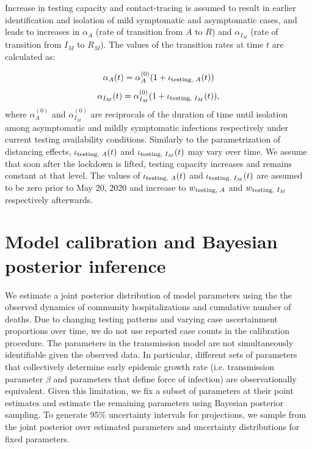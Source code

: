 \documentclass[11pt]{article}
\begin{document}
Increase in testing capacity and contact-tracing is assumed to result in earlier identification and isolation of mild symptomatic and asymptomatic cases, and leads to increases in $\alpha_A$ (rate of transition from $A$ to $R$) and $\alpha_{I_M}$ (rate of transition from $I_M$ to $R_M$). The values of the transition rates at time $t$ are calculated as:

\[ \alpha_A(t) = \alpha_A^{(0)} (1 + \iota\textsubscript{testing, $A$} (t)) \]
\[ \alpha_{I_M}(t) = \alpha_{I_M}^{(0)} (1 + \iota\textsubscript{testing, $I_M$} (t)), \]
where $\alpha_A^{(0)}$ and $\alpha_{I_M}^{(0)}$ are reciprocals of the duration of time until isolation among asymptomatic and mildly symptomatic infections respectively under current testing availability conditions. Similarly to the parametrization of distancing effects, $\iota\textsubscript{testing, $A$} (t)$ and $\iota\textsubscript{testing, $I_M$} (t)$ may vary over time. 
We assume that soon after the lockdown is lifted, testing capacity increases and remains constant at that level. The values of $\iota\textsubscript{testing, $A$} (t)$ and $\iota\textsubscript{testing, $I_M$} (t)$ are assumed to be zero prior to May 20, 2020 and increase to $w\textsubscript{testing, $A$}$ and $w\textsubscript{testing, $I_M$}$ respectively afterwards.  





\section{Model calibration and Bayesian posterior inference}


We estimate a joint posterior distribution of model parameters using the the observed dynamics of community hospitalizations and cumulative number of deaths.  Due to changing testing patterns and varying case ascertainment proportions over time, we do not use reported case counts in the calibration procedure.  The parameters in the transmission model are not simultaneously identifiable given the observed data. In particular, different sets of parameters that collectively determine early epidemic growth rate (i.e. transmission parameter $\beta$ and parameters that define force of infection) are observationally equivalent. Given this limitation, we fix a subset of parameters at their point estimates and estimate the remaining parameters using Bayesian posterior sampling.  To generate 95\% uncertainty intervals for projections, we sample from the joint posterior over estimated parameters and uncertainty distributions for fixed parameters. 
\end{document}

